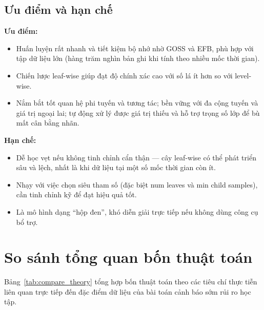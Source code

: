 \documentclass[a4paper]{article}
\newcommand{\code}[1]{{\ttfamily\def\_{\textunderscore\discretionary{}{}{}}#1}}
\def\code#1{#1}%
\def\_{ }%
\begin{document}
\subsection{Ưu điểm và hạn chế}

\textbf{Ưu điểm:}
\begin{itemize}[leftmargin=*]
  \item Huấn luyện rất nhanh và tiết kiệm bộ nhớ nhờ GOSS và EFB, phù hợp với
        tập dữ liệu lớn (hàng trăm nghìn bản ghi khi tính theo nhiều mốc thời
        gian).
  \item Chiến lược leaf-wise giúp đạt độ chính xác cao với số lá ít hơn so với
        level-wise.
  \item Nắm bắt tốt quan hệ phi tuyến và tương tác; bền vững với đa cộng tuyến
        và giá trị ngoại lai; tự động xử lý được giá trị thiếu và hỗ trợ trọng
        số lớp để bù mất cân bằng nhãn.
\end{itemize}

\textbf{Hạn chế:}
\begin{itemize}[leftmargin=*]
  \item Dễ học vẹt nếu không tinh chỉnh cẩn thận --- cây leaf-wise có thể phát
        triển sâu và lệch, nhất là khi dữ liệu tại một số mốc thời gian còn
        ít.
  \item Nhạy với việc chọn siêu tham số (đặc biệt \code{num\_leaves} và
        \code{min\_child\_samples}), cần tinh chỉnh kỹ để đạt hiệu quả tốt.
  \item Là mô hình dạng ``hộp đen'', khó diễn giải trực tiếp nếu không dùng
        công cụ bổ trợ.
\end{itemize}

\section{So sánh tổng quan bốn thuật toán}

Bảng~\ref{tab:compare_theory} tổng hợp bốn thuật toán theo các tiêu chí thực
tiễn liên quan trực tiếp đến đặc điểm dữ liệu của bài toán cảnh báo sớm rủi ro
học tập.
\end{document}
